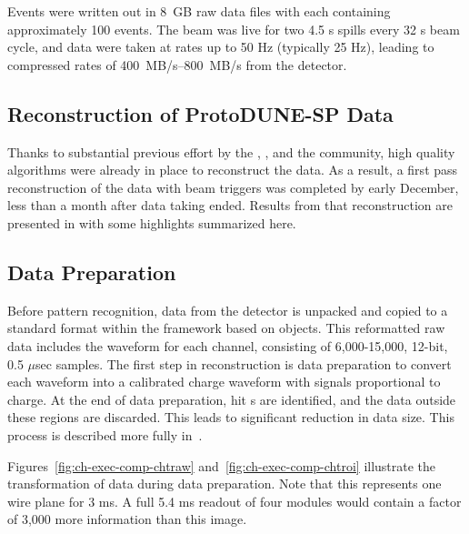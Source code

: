 Events were written out in \SI{8}{GB} raw data files with each containing approximately 100 events. The beam was live for two 4.5 s spills every 32 s beam cycle, and data were taken at  rates up to 50 Hz (typically 25 Hz), leading to compressed  rates of \SIrange{400}{800}{MB/s} from the detector.  




\subsection{Reconstruction of ProtoDUNE-SP Data}
Thanks to substantial previous effort by the , , and the   community, high quality algorithms were already in place to reconstruct the   data.  As a result, a first pass reconstruction of the  data with beam triggers was completed by early December, less than a month after data taking ended.  Results from that reconstruction are presented in \physchtools %
with some highlights summarized here. 



\subsection{Data Preparation}

Before pattern recognition, data from the  detector is
unpacked and copied to a standard format within the  framework based on  objects. 
This reformatted raw data includes the waveform for each channel, consisting of 6,000-15,000,  12-bit, 0.5 $\mu$sec samples. 
The first step in reconstruction is data preparation to
convert each  waveform into a calibrated charge waveform with
signals proportional to charge. At the end of data preparation, hit s are identified, and the data outside these regions are discarded.  This leads to significant reduction in data size. This process is described more fully in~\cite{bib:docdb12349}. %



Figures~\ref{fig:ch-exec-comp-chtraw} and~\ref{fig:ch-exec-comp-chtroi} illustrate the transformation of  data  during data preparation. Note that this represents one wire plane for 3 ms.  A full 5.4 ms readout of four \nominalmodsize modules would contain a factor of 3,000 more information than this image.

